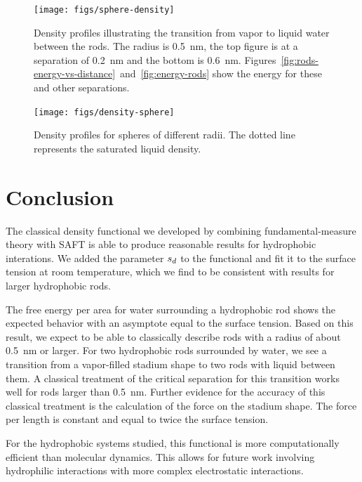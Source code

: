 \documentclass[letterpaper,twocolumn,amsmath,amssymb,prb]{revtex4-1}
\begin{document}
\begin{figure}
\begin{center}
\texttt{[image: figs/sphere-density]}
\end{center}
\caption{ Density profiles illustrating the transition from vapor 
to liquid water between the rods. The radius is 0.5~nm, the top figure is 
at a separation of 0.2~nm and the
bottom is 0.6~nm. Figures~\ref{fig:rods-energy-vs-distance}~and~\ref{fig:energy-rods} show
the energy for these and other separations.}
\label{fig:sphere-density}
\end{figure}


\begin{figure}
\begin{center}
\texttt{[image: figs/density-sphere]}
\end{center}
\caption{ Density profiles for spheres of different radii. The dotted line
represents the saturated liquid density.  }
\label{fig:density-sphere}
\end{figure}

\section{Conclusion}

The classical density functional we developed by combining fundamental-measure 
theory with SAFT is able to produce reasonable results for hydrophobic interations.
We added the parameter $s_d$ to the functional and fit it to the surface tension
at room temperature, which we find to be consistent with results for larger hydrophobic
rods. 

The free energy per area for water surrounding a hydrophobic rod shows the
expected behavior with an asymptote equal to the surface tension.
Based on this result, we expect to be
able to classically describe rods with a radius of about 0.5~nm or larger. 
For two hydrophobic rods surrounded by water, we see a transition from a vapor-filled
stadium shape to two rods with liquid between them. A
classical treatment of the critical separation for this transition
works well for rods larger than 0.5~nm. Further evidence for the
accuracy of this classical treatment is the calculation of the force on the
stadium shape. The force per length is constant and equal to twice the surface tension.

For the hydrophobic systems studied, this functional is more computationally 
efficient than molecular dynamics. This allows for future work
involving hydrophilic interactions with more complex electrostatic interactions.


\end{document}
